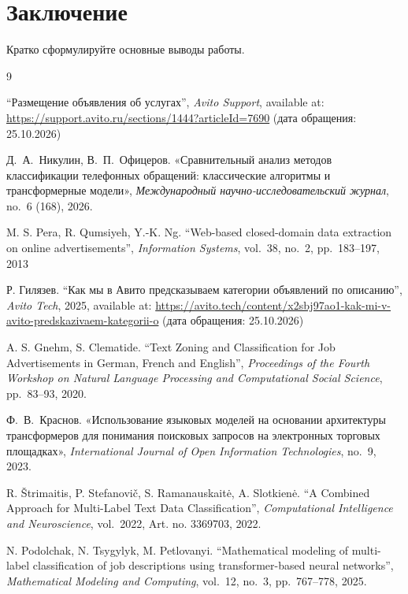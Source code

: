 \documentclass{misisarticle}
\begin{document}
\section{Заключение}

Кратко сформулируйте основные выводы работы.

\begin{thebibliography}{9}

 “Размещение объявления об услугах”, \textit{Avito Support}, available at: \url{https://support.avito.ru/sections/1444?articleId=7690} (дата обращения: 25.10.2026)

 Д.~А.~Никулин, В.~П.~Офицеров. «Сравнительный анализ методов классификации телефонных обращений: классические алгоритмы и трансформерные модели», \textit{Международный научно-исследовательский журнал}, no.~6 (168), 2026.

 M. S. Pera, R. Qumsiyeh, Y.-K. Ng. “Web-based closed-domain data extraction on online advertisements”, \textit{Information Systems}, vol.~38, no.~2, pp.~183--197, 2013

 Р. Гилязев. “Как мы в Авито предсказываем категории объявлений по описанию”, \textit{Avito Tech}, 2025, available at: \url{https://avito.tech/content/x2sbj97ao1-kak-mi-v-avito-predskazivaem-kategorii-o} (дата обращения: 25.10.2026)

 A. S. Gnehm, S. Clematide. “Text Zoning and Classification for Job Advertisements in German, French and English”, \textit{Proceedings of the Fourth Workshop on Natural Language Processing and Computational Social Science}, pp.~83--93, 2020.

 Ф.~В.~Краснов. «Использование языковых моделей на основании архитектуры трансформеров для понимания поисковых запросов на электронных торговых площадках», \textit{International Journal of Open Information Technologies}, no.~9, 2023.

 R. Štrimaitis, P. Stefanovič, S. Ramanauskaitė, A. Slotkienė. “A Combined Approach for Multi-Label Text Data Classification”, \textit{Computational Intelligence and Neuroscience}, vol.~2022, Art. no. 3369703, 2022.

 N. Podolchak, N. Tsygylyk, M. Petlovanyi. “Mathematical modeling of multi-label classification of job descriptions using transformer-based neural networks”, \textit{Mathematical Modeling and Computing}, vol.~12, no.~3, pp.~767--778, 2025.

\end{thebibliography}
\end{document}

